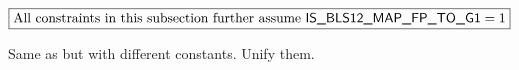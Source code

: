 \[
	\boxed{\text{All constraints in this subsection further assume } \textsf{IS\_BLS12\_MAP\_FP\_TO\_G1} = 1}
\]

Same as \oobInstBlsGOneAdd{} but with different constants. Unify them.